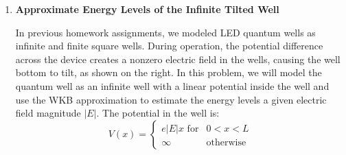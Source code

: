 \documentclass[10pt,letterpaper]{article}
\begin{document}
\begin{enumerate}
\begin{enumerate}[a)]
\begin{enumerate}[i)]
\item Sketch an energy diagram of the system, including the following:

\begin{itemize}

\item The potential $V(x)$

\item The electron's energy $E_{el}$

\item The locations of $x_{0}$ and $x_{1}$. In order to find $x_{1}$, determine where $E_{el} - V(x) = 0$.

\color{violet}
$x_{0} = 0$, and $x_{1} = \num{1.6e-9}$ m, since that's where $E_{el} - V(x) = 0$. 
\color{black}

\textit{Note}: $x_{1}$ may be smaller than $t_{ox}$, in which case the barrier would become triangular.

\end{itemize}

\item Using your values from part b.i), calculate the tunneling probability $T$ and tunneling current density $J_{t}$ in $\text{A/m}^{2}$

\end{enumerate}

\item How does your value in b.iii) compare to what you calculated in Homework 4? Does the shape of the barrier seem to make a significant difference in the tunneling probability?

\end{enumerate}

\item \textbf{Approximate Energy Levels of the Infinite Tilted Well}

In previous homework assignments, we modeled LED quantum wells as infinite and finite square wells. During operation, the potential difference across the device creates a nonzero electric field in the wells, causing the well bottom to tilt, as shown on the
right. In this problem, we will model the quantum well as an infinite well with a linear potential inside the well and use the WKB approximation to estimate the energy levels a given electric field magnitude $|E|$. The potential in the well is:
$$V(x) = \begin{cases}
e|E|x \text{\ \ \ \ for} & 0 < x < L \\
\infty & \text{otherwise}
\end{cases}$$


\end{enumerate}
\end{document}
